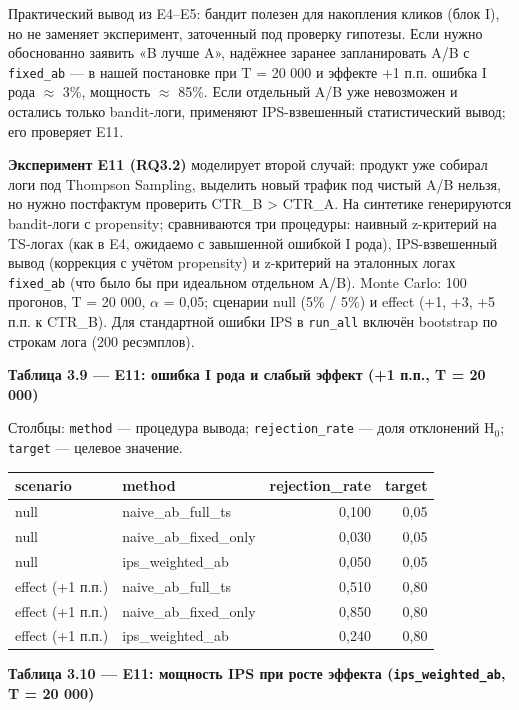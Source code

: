 Практический вывод из E4--E5: бандит полезен для накопления кликов (блок I), но не заменяет эксперимент, заточенный под проверку гипотезы. Если нужно обоснованно заявить «B лучше A», надёжнее заранее запланировать A/B с \texttt{fixed\_ab} --- в нашей постановке при T = 20 000 и эффекте +1 п.п. ошибка I рода $\approx$ 3\%, мощность $\approx$ 85\%. Если отдельный A/B уже невозможен и остались только bandit-логи, применяют IPS-взвешенный статистический вывод; его проверяет E11.

\textbf{Эксперимент E11 (RQ3.2)} моделирует второй случай: продукт уже собирал логи под Thompson Sampling, выделить новый трафик под чистый A/B нельзя, но нужно постфактум проверить CTR\_B \textgreater{} CTR\_A. На синтетике генерируются bandit-логи с propensity; сравниваются три процедуры: наивный z-критерий на TS-логах (как в E4, ожидаемо с завышенной ошибкой I рода), IPS-взвешенный вывод (коррекция с учётом propensity) и z-критерий на эталонных логах \texttt{fixed\_ab} (что было бы при идеальном отдельном A/B). Monte Carlo: 100 прогонов, T = 20 000, $\alpha$ = 0,05; сценарии null (5\% / 5\%) и effect (+1, +3, +5 п.п. к CTR\_B). Для стандартной ошибки IPS в \texttt{run\_all} включён bootstrap по строкам лога (200 ресэмплов).

\textbf{Таблица 3.9 --- E11: ошибка I рода и слабый эффект (+1 п.п., T = 20 000)}

Столбцы: \texttt{method} --- процедура вывода; \texttt{rejection\_rate} --- доля отклонений H$_0$; \texttt{target} --- целевое значение.

\begingroup\footnotesize\setlength{\tabcolsep}{4pt}
\begin{xltabular}{\linewidth}{@{}llrr@{}}
\toprule\noalign{}
scenario & method & rejection\_rate & target \\
\midrule\noalign{}
\endhead
\bottomrule\noalign{}
\endlastfoot
null & naive\_ab\_full\_ts & 0,100 & 0,05 \\
null & naive\_ab\_fixed\_only & 0,030 & 0,05 \\
null & ips\_weighted\_ab & 0,050 & 0,05 \\
effect (+1 п.п.) & naive\_ab\_full\_ts & 0,510 & 0,80 \\
effect (+1 п.п.) & naive\_ab\_fixed\_only & 0,850 & 0,80 \\
effect (+1 п.п.) & ips\_weighted\_ab & 0,240 & 0,80 \\
\end{xltabular}
\endgroup

\textbf{Таблица 3.10 --- E11: мощность IPS при росте эффекта (\texttt{ips\_weighted\_ab}, T = 20 000)}

